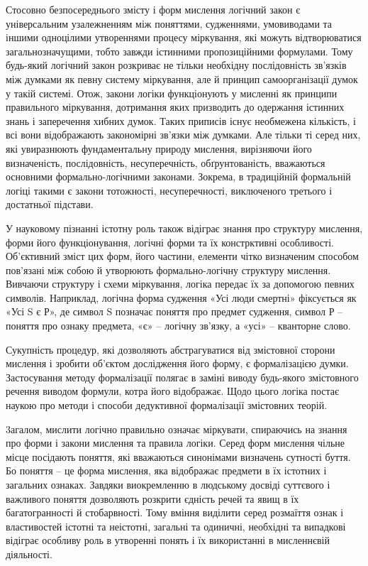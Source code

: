 Стосовно безпосереднього змісту і форм мислення логічний закон є
універсальним узалежненням між поняттями, судженнями, умовиводами та
іншими одноцілими утвореннями процесу міркування, які можуть
відтворюватися загальнозначущими, тобто завжди істинними пропозиційними
формулами. Тому будь-який логічний закон розкриває не тільки необхідну
послідовність зв’язків між думками як певну систему міркування, але й
принцип самоорганізації думок у такій системі. Отож, закони логіки
функціонують у мисленні як принципи правильного міркування, дотримання
яких призводить до одержання істинних знань і заперечення хибних думок.
Таких приписів існує необмежена кількість, і всі вони відображають
закономірні зв’язки між думками. Але тільки ті серед них, які увиразнюють
фундаментальну природу мислення, вирізняючи його визначеність,
послідовність, несуперечність, обґрунтованість, вважаються основними
формально-логічними законами. Зокрема, в традиційній формальній логіці
такими є закони тотожності, несуперечності, виключеного третього і достатньої
підстави.

У науковому пізнанні істотну роль також відіграє знання про структуру
мислення, форми його функціонування, логічні форми та їх констрктивні
особливості. Об’єктив\-ний зміст цих форм, його частини, елементи чітко
визначеним способом пов’язані між собою й утворюють формально-логічну
структуру мислення. Вивчаючи структуру і схеми міркування, логіка передає їх
за допомогою певних символів. Наприклад, логічна форма судження «Усі люди
смертні» фіксується як «Усі S є Р», де символ S позначає поняття про предмет
судження, символ Р – поняття про ознаку предмета, «є» – логічну зв’язку, а
«усі» – кванторне слово.

Сукупність процедур, які дозволяють абстрагуватися від змістовної сторони
мислення і зробити об’єктом дослідження його форму, є формалізацією думки.
Застосування методу формалізації полягає в заміні виводу будь-якого
змістовного речення виводом формули, котра його відображає. Щодо цього
логіка постає наукою про методи і способи дедуктивної формалізації
змістовних теорій.

3агалом, мислити логічно правильно означає міркувати, спираючись на
знання про форми і закони мислення та правила логіки. Серед форм мислення
чільне місце посідають поняття, які вважаються синонімами визначень сутності
буття. Бо поняття – це форма мислення, яка відображає предмети в їх істотних і
загальних ознаках. Завдяки виокремленню в людському досвіді суттєвого і
важливого поняття дозволяють розкрити єдність речей та явищ в їх
багатогранності й стобарвності. Тому вміння виділити серед розмаїття ознак і
властивостей істотні та неістотні, загальні та одиничні, необхідні та випадкові
відіграє особливу роль в утворенні понять і їх використанні в мисленнєвій
діяльності.

